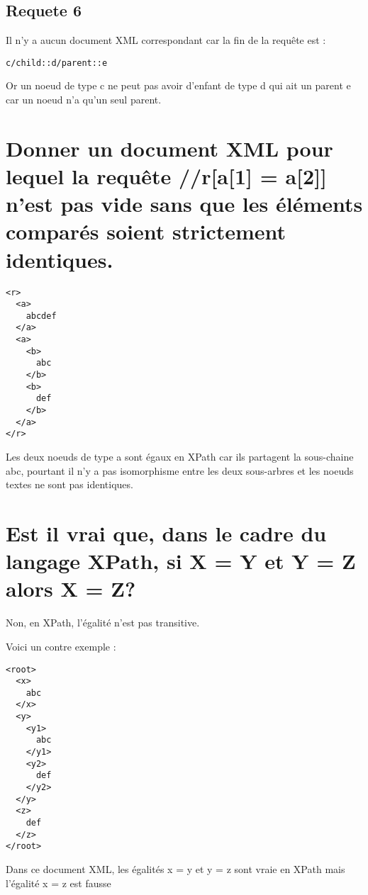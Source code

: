 \subsection{Requete 6}
Il n'y a aucun document XML correspondant car la fin de la requête est :
\begin{verbatim}
c/child::d/parent::e
\end{verbatim}
Or un noeud de type c ne peut pas avoir d'enfant de type d qui ait un parent e car un noeud n'a qu'un seul parent.

\section{Donner un document XML pour lequel la requête //r[a[1] = a[2]] n’est pas vide sans que les éléments comparés soient strictement identiques.}
\begin{verbatim}
<r>
  <a>
    abcdef
  </a>
  <a>
    <b>
      abc
    </b>
    <b>
      def
    </b>
  </a>
</r>
\end{verbatim}
Les deux noeuds de type a sont égaux en XPath car ils partagent la sous-chaine abc, pourtant il n'y a pas isomorphisme entre les deux sous-arbres et les noeuds textes ne sont pas identiques.

\section{Est il vrai que, dans le cadre du langage XPath, si X = Y et Y = Z alors X = Z?}
Non, en XPath, l'égalité n'est pas transitive.

Voici un contre exemple :
\begin{verbatim}
<root>
  <x>
    abc
  </x>
  <y>
    <y1>
      abc
    </y1>
    <y2>
      def
    </y2>
  </y>
  <z>
    def
  </z>
</root>
\end{verbatim}

Dans ce document XML, les égalités x = y et y = z sont vraie en XPath mais l'égalité x = z est fausse